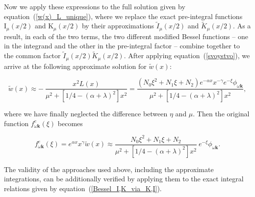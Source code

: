 \documentclass[draft]{agujournal2019}
\renewcommand{\vec}{\mathbf}
\begin{document}
{Now we apply these expressions to the full solution given by
equation~(\ref{w(x)_L_unique}), where we replace the exact pre-integral
functions $\mathrm{I}_{\mu}\left(  x/2\right)  $ and $\mathrm{K}_{\mu}(x/2)
$ by their approximations $\tilde{I}_{\mu}(x/2) $
and $\tilde{K}_{\mu}\left(  x/2\right)  $. As a result, in each of the two
terms, the two different modified Bessel functions -- one in the integrand and
the other in the pre-integral factor -- combine together to the common
factor $\tilde{I}_{\mu}\left(  x/2\right)  \tilde{K}_{\mu}\left(  x/2\right)
$. After applying equation~(\ref{svoystvo}), we arrive at the following
approximate solution for $\tilde{w}(x)$:
\begin{linenomath*}
\begin{equation}
\tilde{w}(x)\approx-\ \frac{x^{2}L(x)}{\mu^{2}+[1/4-(
\alpha+\lambda)  ^{2}]  x^{2}}=\frac{(N_{0}\xi^{2}+N_{1}
\xi+N_{2})  e^{-\alpha x}x^{-\gamma}e^{-\xi}\phi_{\omega\vec{k}}}
{\mu^{2}+[1/4-(\alpha+\lambda)  ^{2}]  x^{2}},
\label{w(x)_approximate}
\end{equation}
\end{linenomath*}
where we have finally neglected the difference between $\eta$ and $\mu$. Then the
original function $f_{\omega\vec{k}}^{e}(\xi)$ becomes
\begin{linenomath*}
\[
f_{\omega\vec{k}}^{e}(\xi)=e^{\alpha x}x^{\gamma}\tilde{w}(x)
\approx\frac{N_{0}\xi^{2}+N_{1}\xi+N_{2}}{\mu^{2}+[1/4-(
\alpha+\lambda)  ^{2}]  x^{2}}\ e^{-\xi}\phi_{\omega\vec{k}}.
\]
\end{linenomath*}
The validity of the approaches used above, including the approximate integrations, 
can be additionally verified by applying them to the exact integral relations 
given by equation~(\ref{Bessel_I,K_via_K,I}).

}
\end{document}
